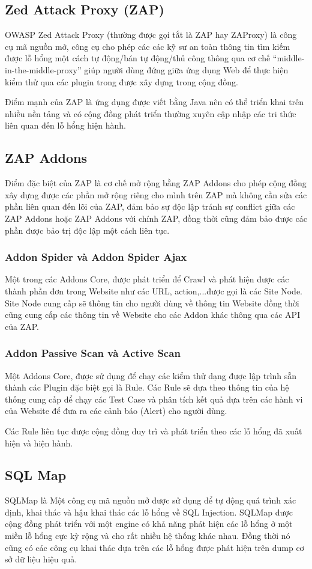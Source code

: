 \documentclass[./../main.tex]{subfiles}
\begin{document}
\subsection{Zed Attack Proxy (ZAP)}
OWASP Zed Attack Proxy (thường được gọi tắt là  ZAP hay ZAProxy) là công cụ mã nguồn mở, công cụ cho phép các các kỹ sư an toàn thông tin tìm kiếm được lỗ hổng một cách tự động/bán tự động/thủ công thông qua cơ chế “middle-in-the-middle-proxy” giúp người dùng đứng giữa ứng dụng Web để thực hiện kiểm thử qua các plugin trong được xây dựng trong cộng đồng.

Điểm mạnh của ZAP là ứng dụng được viết bằng Java nên có thể triển khai trên nhiều nền tảng và có cộng đồng phát triển thường xuyên cập nhập các tri thức liên quan đến lỗ hổng hiện hành.

\subsection{ZAP Addons}
Điểm đặc biệt của ZAP là cơ chế mở rộng bằng ZAP Addons cho phép cộng đồng xây dựng được các phần mở rộng riêng cho mình trên ZAP mà không cần sửa các phần liên quan đến lõi của ZAP, đảm bảo sự độc lập tránh sự conflict giữa các ZAP Addons hoặc ZAP Addons với chính ZAP, đồng thời cũng đảm bảo được các phần được bảo trị độc lập một cách liên tục.
\subsubsection{Addon Spider và Addon Spider Ajax}
Một trong các Addons Core, được phát triển để Crawl và phát hiện được các thành phần đơn trong Website như các URL, action,...được gọi là các Site Node. Site Node cung cấp sẽ thông tin cho người dùng về thông tin Website đồng thời cũng cung cấp các thông tin về Website cho các Addon khác thông qua các API của ZAP.
\subsubsection{Addon Passive Scan và Active Scan}
Một Addons Core, được sử dụng để chạy các kiểm thử dạng được lập trình sẵn thành các Plugin đặc biệt gọi là Rule. Các Rule sẽ dựa theo thông tin của hệ thống cung cấp để chạy các Test Case và phân tích kết quả dựa trên các hành vi của Website để đưa ra các cảnh báo (Alert) cho người dùng.

Các Rule liên tục được cộng đồng duy trì và phát triển theo các lỗ hổng đã xuất hiện và hiện hành.
\subsection{SQL Map}
SQLMap là Một công cụ mã nguồn mở được sử dụng để tự động quá trình xác định, khai thác và hậu khai thác các lỗ hổng về SQL Injection.
SQLMap được cộng đồng phát triển với một engine có khả năng phát hiện các lỗ hổng ở một miền lỗ hổng cực kỳ rộng và cho rất nhiều hệ thống khác nhau. Đồng thời nó cũng có các công cụ khai thác dựa trên các lỗ hổng được phát hiện trên dump cơ sở dữ liệu hiệu quả.
\end{document}
